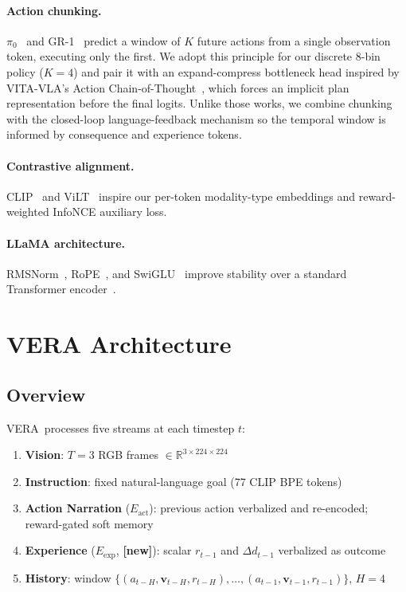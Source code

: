 \documentclass{article}
\newcommand{\modelname}{\textsc{VERA}\xspace}
\newcommand{\Lact}{$E_{\mathrm{act}}$\xspace}
\newcommand{\Lexp}{$E_{\mathrm{exp}}$\xspace}
\newcommand{\NEW}{\textcolor{NewOrange}{\textbf{[new]}}\xspace}
\begin{document}
\paragraph{Action chunking.}
$\pi_0$~\citep{black2024pi0} and GR-1~\citep{wu2023gr1} predict a window of $K$
future actions from a single observation token, executing only the first.
We adopt this principle for our discrete 8-bin policy ($K{=}4$) and pair it
with an expand-compress bottleneck head inspired by VITA-VLA's
Action Chain-of-Thought~\citep{vitavla2024}, which forces an implicit plan
representation before the final logits.
Unlike those works, we combine chunking with the closed-loop language-feedback
mechanism so the temporal window is informed by consequence and experience tokens.

\paragraph{Contrastive alignment.}
CLIP~\citep{radford2021clip} and ViLT~\citep{kim2021vilt} inspire our
per-token modality-type embeddings and reward-weighted InfoNCE auxiliary loss.

\paragraph{LLaMA architecture.}
RMSNorm~\citep{zhang2019rmsnorm}, RoPE~\citep{su2021rope}, and
SwiGLU~\citep{shazeer2020swiglu} improve stability over a standard
Transformer encoder~\citep{vaswani2017attention}.

\section{VERA Architecture}
\label{sec:model}

\subsection{Overview}

\modelname\ processes five streams at each timestep $t$:
\begin{enumerate}[leftmargin=1.5em,itemsep=1pt]
  \item \textbf{Vision}: $T{=}3$ RGB frames $\in\mathbb{R}^{3\times224\times224}$
  \item \textbf{Instruction}: fixed natural-language goal (77 CLIP BPE tokens)
  \item \textbf{Action Narration} (\Lact): previous action verbalized and
        re-encoded; reward-gated soft memory
  \item \textbf{Experience} (\Lexp, \NEW): scalar $r_{t-1}$ and
        $\Delta d_{t-1}$ verbalized as outcome
  \item \textbf{History}: window $\{(a_{t-H},\mathbf{v}_{t-H},r_{t-H}),
        \ldots,(a_{t-1},\mathbf{v}_{t-1},r_{t-1})\}$, $H{=}4$
\end{enumerate}
\end{document}
